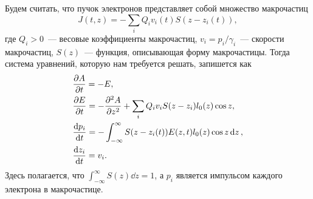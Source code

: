 \documentclass[DIV=11,12pt,a4paper]{scrartcl}
\begin{document}
Будем считать, что пучок электронов представляет собой множество макрочастиц
\begin{equation}
    J(t,z) = -\sum_i Q_i v_i(t) S(z - z_i(t)),
\end{equation}
где $Q_i > 0$~--- весовые коэффициенты макрочастиц, $v_i = p_i / \gamma_i$~--- скорости макрочастиц, $S(z)$~--- функция, описывающая форму макрочастицы.
Тогда система уравнений, которую нам требуется решать, запишется как
\begin{align}
    &\pdv{A}{t} = - E,\\
    &\pdv{E}{t} = -\pdv[2]{A}{z} + \sum_i Q_i v_i S(z - z_i) l_0(z) \cos z,\\
    &\dv{p_i}{t} = -\int_{-\infty}^{\infty} S(z-z_i(t)) E(z,t) l_0(z)  \cos z \dd{z},\\
    &\dv{z_i}{t} = v_i.
\end{align}
Здесь полагается, что $\int_{-\infty}^\infty S(z) \dd{z} = 1$, а $p_i$ является импульсом каждого электрона в макрочастице.
\end{document}
